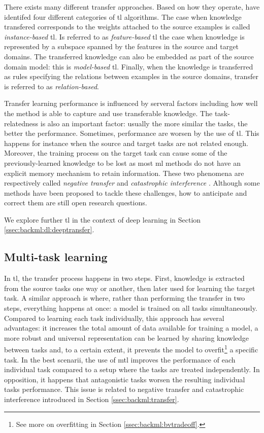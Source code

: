 There exists many different transfer approaches. Based on how they operate,
\parencite{yang2020transfer} have identifed four different categories of \acrlong{tl}
algorithms. The case when knowledge transfered corresponds to the weights attached
to the source examples is called \textit{instance-based} \acrlong{tl}. Is referred
to as \textit{feature-based} \acrlong{tl} the case when knowledge is represented
by a subspace spanned by the features in the source and target domains. The
transferred knowledge can also be embedded as part of the source domain model:
this is \textit{model-based} \acrlong{tl}. Finally, when the knowledge is transferred
as rules specifying the relations between examples in the source domains, transfer
is referred to as \textit{relation-based}.

Transfer learning performance is influenced by serveral factors including how well
the method is able to capture and use transferable knowledge. The task-relatedness
is also an important factor: usually the more similar the tasks, the better the
performance. Sometimes, performance are worsen by the use of \acrlong{tl}. This
happens for instance when the source and target tasks are not related enough.
Moreover, the training process on the target task can cause some of the
previously-learned knowledge to be lost as most \acrlong{ml} methods do not have
an explicit memory mechanism to retain information. These two phenomena are
respectively called \textit{negative transfer} \parencite{zhang2020overcoming}
and \textit{catastrophic interference} \parencite{french1999catastrophic}. Although
some methods have been proposed to tackle these challenges, how to anticipate and
correct them are still open research questions.

We explore further \acrlong{tl} in the context of deep learning in Section
\ref{ssec:backml:dl:deeptransfer}.

\subsection{Multi-task learning}
\label{ssec:backml:mtl}

In \acrlong{tl}, the transfer process happens in two steps. First, knowledge is
extracted from the source tasks one way or another, then later used for learning
the target task. A similar approach is  where, rather than performing
the transfer in two steps, everything happens at once: a model is trained on all
tasks simultaneously. Compared to learning each task individually, this approach
has several advantages: it increases the total amount of data available for training
a model, a more robust and universal representation can be learned by sharing
knowledge between tasks and, to a certain extent, it prevents the model to
overfit\footnote{See more on overfitting in Section \ref{ssec:backml:bvtradeoff}.}
a specific task. In the best scenarii, the use of \acrlong{mtl} improves the
performance of each individual task compared to a setup where the tasks are treated
independently. In opposition, it happens that antagonistic tasks worsen the
resulting individual tasks performance. This issue is related to negative transfer
and catastrophic interference introduced in Section \ref{ssec:backml:transfer}.

